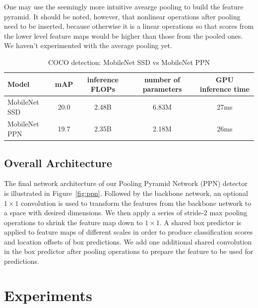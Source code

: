 \documentclass[10pt,twocolumn,letterpaper]{article}
\begin{document}
One may use the seemingly more intuitive avearge pooling
to build the feature pyramid.
It should be noted, however, that
nonlinear operations after pooling need to be inserted,
because otherwise it is a linear operations so that
scores from the lower level feature maps would be higher than
those from the pooled ones.
We haven't experimented with the average pooling yet.


\begin{table}[t]
\begin{center}
\begin{tabular}{l|c|c|c|c}
Model & mAP & inference FLOPs & number of parameters & GPU inference time\\
\hline
\hline
MobileNet SSD & 20.0 & 2.48B & 6.83M & 27ms \\
\hline
MobileNet PPN & 19.7 & 2.35B & 2.18M & 26ms \\
\end{tabular}
\end{center}
\caption{COCO detection: MobileNet SSD vs MobileNet PPN}
\label{comparison}
\end{table}



\subsection{Overall Architecture}


The final network architecture of our Pooling Pyramid
Network (PPN) detector is illustrated in
Figure~\ref{fig:ppn}.  Followed by the backbone network, an
optional $1\times 1$ convolution is used to transform the features
from the backbone network to a space with desired
dimensions.  We then apply a series of stride-2 max pooling
operations to shrink the feature map down to $1\times 1$.  A shared
box predictor is applied to feature maps of different scales
in order to produce classification scores and location
offsets of box predictions.  We add one additional shared
convolution in the box predictor after pooling operations to
prepare the feature to be used for predictions.


\section{Experiments}
\end{document}
